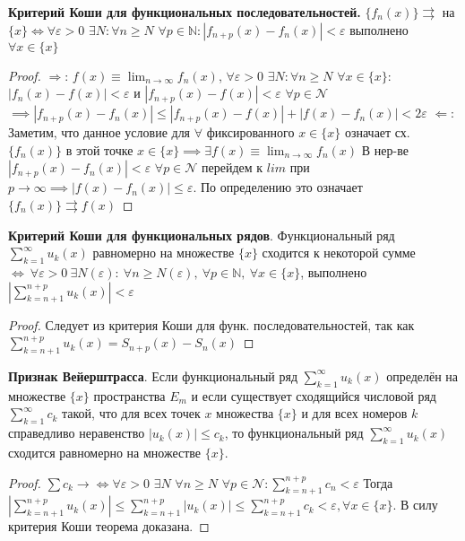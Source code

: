 \bigbreak 
\textbf{Критерий Коши для функциональных последовательностей.} 
$\{f_n(x)\} \rightrightarrows$ на $\{x\} \iff \forall \varepsilon > 0$ $\exists N: \forall n \geq N$ $\forall p \in \mathbb{N}: |f_{n+p}(x) - f_n(x)| < \varepsilon$ выполнено $\forall x \in \{x\}$

\begin{proof}
$\Rightarrow$: $f(x) \equiv \lim_{n \rightarrow \infty} f_n(x)$, $\forall \varepsilon > 0$ $\exists N: \forall n \geq N$ $\forall x \in \{x\}$: \newline 
$|f_n(x) - f(x)| < \varepsilon$ и $|f_{n+p}(x) - f(x)| < \varepsilon $ $ \forall p \in \mathcal{N}$ $\implies |f_{n+p}(x) - f_n(x)| \leq |f_{n+p}(x) - f(x)| + |f(x) - f_n(x)| < 2 \varepsilon$ \newline
$\Leftarrow$: Заметим, что данное условие для $\forall$ фиксированного $x \in \{x\}$ означает сх. $\{f_n(x)\}$ в этой точке $x \in \{x\} \implies \exists f(x) \equiv \lim_{n \rightarrow \infty} f_n(x)$
В нер-ве $|f_{n+p}(x) - f_n(x)| < \varepsilon$ $\forall p \in \mathcal{N}$ перейдем к $lim$ при $p \rightarrow \infty \implies |f(x) - f_n(x)| \leq \varepsilon$. По определению это означает $\{f_n(x)\} \rightrightarrows f(x)$
\end{proof}

\bigbreak 
\textbf{Критерий Коши для функциональных рядов}. Функциональный ряд 
$\displaystyle \sum_{k=1}^{\infty} u_k(x)$ равномерно на множестве $\{x\}$ сходится к некоторой сумме 
$\iff ~ \forall \varepsilon > 0 ~ \exists N(\varepsilon): ~ \forall n \geqslant N(\varepsilon), ~ \forall p \in \mathbb{N}, ~ \forall x \in \{x\}$, выполнено
$\left|\sum_{k=n+1}^{n+p} u_k(x)\right| < \varepsilon$
\begin{proof}
Следует из критерия Коши для функ. последовательностей, так как $\sum^{n+p}_{k=n+1} u_k(x)=S_{n+p}(x)-S_n(x)$
\end{proof}


\bigbreak 
\textbf{Признак Вейерштрасса}. Если функциональный ряд $\displaystyle \sum_{k=1}^{\infty} u_k(x)$ определён на множестве $\{x\}$ пространства $E_m$ и если существует сходящийся числовой ряд $\displaystyle \sum_{k=1}^{\infty} c_k$ такой, что для всех точек $x$ множества $\{x\}$ и для всех номеров $k$ справедливо неравенство $|u_k(x)| \leqslant c_k$, то функциональный ряд $\displaystyle \sum_{k=1}^{\infty} u_k(x)$ сходится равномерно на множестве $\{x\}$.

\begin{proof}
$\sum c_k \to \Leftrightarrow \forall \varepsilon > 0$ $\exists N$ $\forall n \geq N$ $\forall p \in \mathcal{N}: \sum_{k = n + 1}^{n + p} c_n < \varepsilon$ \newline
Тогда $\left|\sum_{k = n + 1}^{n + p}u_k(x)\right| \leq \sum_{k = n + 1}^{n+p}|u_k(x)| \leq \sum_{k = n + 1}^{n+p}c_k < \varepsilon, \forall x \in \{x\}$. В силу критерия Коши теорема доказана.
\end{proof}

